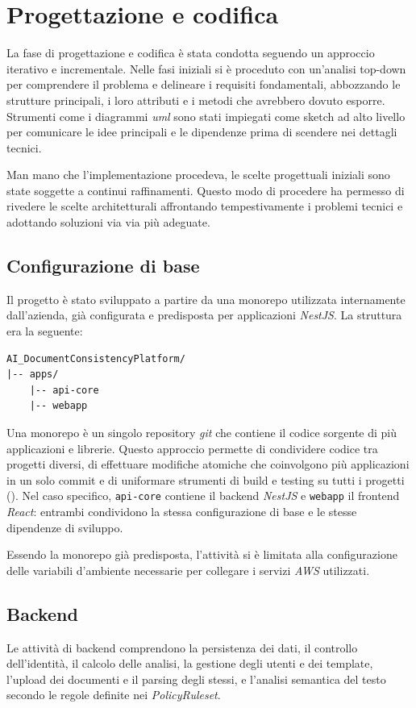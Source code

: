 \chapter{Progettazione e codifica}
\label{cap:progettazione_codifica}
La fase di progettazione e codifica è stata condotta seguendo un approccio iterativo e incrementale. Nelle fasi iniziali si è proceduto con un'analisi top-down per comprendere il problema e delineare i requisiti fondamentali, abbozzando le strutture principali, i loro attributi e i metodi che avrebbero dovuto esporre. Strumenti come i diagrammi \emph{\gls{uml}\glsfirstoccur} sono stati impiegati come sketch ad alto livello per comunicare le idee principali e le dipendenze prima di scendere nei dettagli tecnici.

Man mano che l'implementazione procedeva, le scelte progettuali iniziali sono state soggette a continui raffinamenti. Questo modo di procedere ha permesso di rivedere le scelte architetturali affrontando tempestivamente i problemi tecnici e adottando soluzioni via via più adeguate.

\section{Configurazione di base}
Il progetto è stato sviluppato a partire da una monorepo utilizzata internamente dall'azienda, già configurata e predisposta per applicazioni \emph{NestJS}. La struttura era la seguente:

\begin{verbatim}
AI_DocumentConsistencyPlatform/
|-- apps/
    |-- api-core
    |-- webapp
\end{verbatim}

Una monorepo è un singolo repository \emph{git} che contiene il codice sorgente di più applicazioni e librerie. Questo approccio permette di condividere codice tra progetti diversi, di effettuare modifiche atomiche che coinvolgono più applicazioni in un solo commit e di uniformare strumenti di build e testing su tutti i progetti (\cite{site:nx}). Nel caso specifico, \texttt{api-core} contiene il backend \emph{NestJS} e \texttt{webapp} il frontend \emph{React}: entrambi condividono la stessa configurazione di base e le stesse dipendenze di sviluppo.

Essendo la monorepo già predisposta, l'attività si è limitata alla configurazione delle variabili d'ambiente necessarie per collegare i servizi \emph{AWS} utilizzati.

\section{Backend}
Le attività di backend comprendono la persistenza dei dati, il controllo dell'identità, il calcolo delle analisi, la gestione degli utenti e dei template, l'upload dei documenti e il parsing degli stessi, e l'analisi semantica del testo secondo le regole definite nei \emph{PolicyRuleset}.\\


